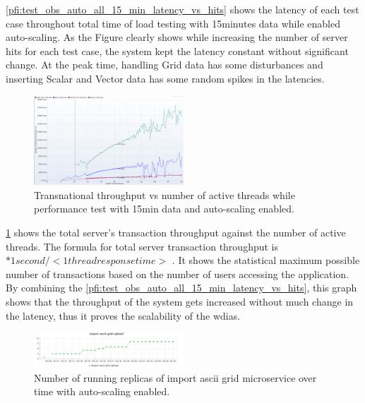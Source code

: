 \documentclass[conference]{IEEEtran}
\begin{document}
\cref{pfi:test_obs_auto_all_15_min_latency_vs_hits} shows the latency of each test case throughout total time of load testing with 15minutes data while enabled auto-scaling. As the Figure clearly shows while increasing the number of server hits for each test case, the system kept the latency constant without significant change. At the peak time, handling Grid data has some disturbances and inserting Scalar and Vector data has some random spikes in the latencies.

\begin{figure}[t!]
\centerline{\includegraphics[width=0.5\textwidth]{results/obs/all_auto/obs_all_auto_15m_transaction_throughtput_vs_threads.png}}
\caption{Transnational throughput vs number of active threads while performance test with 15min data and auto-scaling enabled.}
\label{pfi:test_obs_auto_all_15_min_throughput_vs_threads}
\end{figure}

\cref{pfi:test_obs_auto_all_15_min_throughput_vs_threads} shows the total server's transaction throughput against the number of active threads.
The formula for total server transaction throughput is \(<active threads> * 1 second / <1 thread response time>\) \cite{JMeterPluginsTransactionPlugin}. It shows the statistical maximum possible number of transactions based on the number of users accessing the application.
By combining the \cref{pfi:test_obs_auto_all_15_min_latency_vs_hits}, this graph shows that the throughput of the system gets increased without much change in the latency, thus it proves the scalability of the \acrshort{wdias}.

\begin{figure}[tb!]
    \centering
    \includegraphics[width=0.5\textwidth]{results/obs/all_auto/obs_all_auto_15m_import_grid_pod.png}
    \caption{Number of running replicas of import ascii grid microservice over time with auto-scaling enabled.}
    \label{pfi:obs_all_auto_15m_import_grid_pod}
\end{figure}
\end{document}
